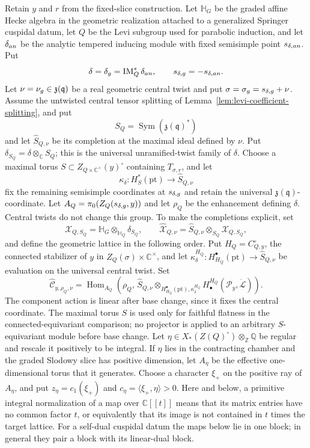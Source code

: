 \documentclass[10pt,a4paper]{amsart}
\newcommand{\Hh}{\mathbb H}
\newcommand{\C}{\mathbb C}
\newcommand{\A}{\C[[t]]}
\begin{document}
Retain $y$ and $r$ from the fixed-slice construction.  Let $\Hh_G$ be the
graded affine Hecke algebra in the geometric realization attached to a generalized
Springer cuspidal datum, let $Q$ be the Levi subgroup used for parabolic
induction, and let $\delta_{\rm an}$ be the analytic tempered inducing
module with fixed semisimple point $s_{\delta,{\rm an}}$.  Put
\[
 \delta=\delta_{\rm g}=\operatorname{IM}_Q^*\delta_{\rm an},
 \qquad s_{\delta,{\rm g}}=-s_{\delta,{\rm an}}.
\]
Let $\nu=\nu_{\rm g}\in\mathfrak z(\mathfrak q)$ be a real geometric
central twist and put $\sigma=\sigma_{\rm g}=s_{\delta,{\rm g}}+\nu$.
Assume the untwisted central tensor splitting of
Lemma~\ref{lem:levi-coefficient-splitting}, and put
\[
 S_Q=\operatorname{Sym}(\mathfrak z(\mathfrak q)^*)
\]
and let $\widehat S_{Q,\nu}$ be its completion at the maximal ideal defined by
$\nu$.  Put $\delta_{S_Q}=\delta\otimes_{\mathbb C}S_Q$; this is the
universal unramified-twist family of $\delta$.  Choose a maximal torus
$S\subset Z_{Q\times\mathbb C^\times}(y)^\circ$ containing
$T_{\sigma,r}$, and let
\[
 \kappa_\delta:H_S^*(\mathrm{pt})\longrightarrow\widehat S_{Q,\nu}
\]
fix the remaining semisimple coordinates at $s_{\delta,{\rm g}}$ and retain
the universal $\mathfrak z(\mathfrak q)$-coordinate.  Let
$A_Q=\pi_0(Z_Q(s_{\delta,{\rm g}},y))$ and let $\rho_Q$ be the enhancement
defining $\delta$.  Central twists do not change this group.
To make the completions explicit, set
\[
 \mathcal X_{Q,S_Q}=\Hh_G\otimes_{\Hh_Q}\delta_{S_Q},\qquad
 \widehat{\mathcal X}_{Q,\nu}
 =\widehat S_{Q,\nu}\otimes_{S_Q}\mathcal X_{Q,S_Q},
\]
and define the geometric lattice in the following order.
Put $H_Q=C_{Q,y}^\circ$, the connected stabilizer of $y$ in
$Z_Q(\sigma)\times\mathbb C^\times$, and let
$\kappa_\delta^{H_Q}:H_{H_Q}^\bullet(\mathrm{pt})\to\widehat S_{Q,\nu}$
be evaluation on the universal central twist.  Set
\[
 \widehat{\mathcal C}_{y,\rho_Q,\nu}
 =\operatorname{Hom}_{A_Q}\!\left(
 \rho_Q,\,
 \widehat S_{Q,\nu}\otimes_{H_{H_Q}^\bullet(\mathrm{pt}),
                            \kappa_\delta^{H_Q}}
 H_\bullet^{H_Q}(\mathcal P_y,\dot{\mathcal L})\right).
\]
The component action is linear after base change, since it fixes the
central coordinate.  The maximal torus $S$ is used only for faithful
flatness in the connected-equivariant comparison; no projector is
applied to an arbitrary $S$-equivariant module before base change.
Let $\eta\in X_*(Z(Q)^\circ)\otimes_{\mathbb Z}\mathbb Q$ be regular and
rescale it positively to be integral.  If $\eta$ lies in the contracting
chamber and the graded Slodowy slice has positive dimension, let $A_\eta$ be the effective
one-dimensional torus that it generates.  Choose a character $\xi_+$ on the
positive ray of $A_\eta$, and put
$z_\eta=c_1(\xi_+)$ and
$c_\eta=\langle\xi_+,\eta\rangle>0$.
Here and below, a primitive integral normalization of a map over $\A$ means
that its matrix entries have no common factor $t$, or equivalently that its
image is not contained in $t$ times the target lattice.  For a self-dual
cuspidal datum the maps below lie in one block; in general they pair a block
with its linear-dual block.
\end{document}
